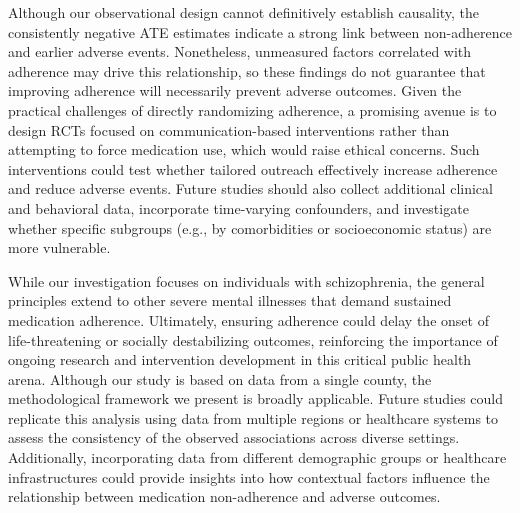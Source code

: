 Although our observational design cannot definitively establish causality, the consistently negative ATE estimates indicate a strong link between non-adherence and earlier adverse events.
Nonetheless, unmeasured factors correlated with adherence may drive this relationship, so these findings do not guarantee that improving adherence will necessarily prevent adverse outcomes.
Given the practical challenges of directly randomizing adherence, a promising avenue is to design RCTs focused on communication-based interventions rather than attempting to force medication use, which would raise ethical concerns.
Such interventions could test whether tailored outreach effectively increase adherence and reduce adverse events.
Future studies should also collect additional clinical and behavioral data, incorporate time-varying confounders, and investigate whether specific subgroups (e.g., by comorbidities or socioeconomic status) are more vulnerable.

While our investigation focuses on individuals with schizophrenia, the general principles extend to other severe mental illnesses that demand sustained medication adherence.
Ultimately, ensuring adherence could delay the onset of life-threatening or socially destabilizing outcomes, reinforcing the importance of ongoing research and intervention development in this critical public health arena.
Although our study is based on data from a single county, the methodological framework we present is broadly applicable.
Future studies could replicate this analysis using data from multiple regions or healthcare systems to assess the consistency of the observed associations across diverse settings.
Additionally, incorporating data from different demographic groups or healthcare infrastructures could provide insights into how contextual factors influence the relationship between medication non-adherence and adverse outcomes.


